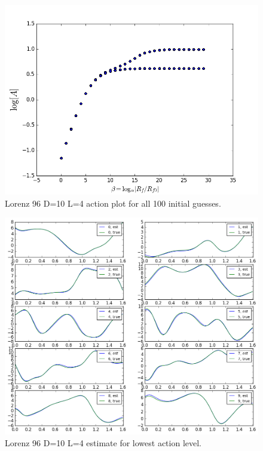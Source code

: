 \documentclass[11pt]{article}
\begin{document}
{\begin{figure}[h]
\centering
\includegraphics[width=1.0\textwidth]{figure/Lorenz96_single/action.png}
\caption{Lorenz 96 D=10 L=4 action plot for all 100 initial guesses.}
\label{fig:lorenz96}
\end{figure}

\begin{figure}[h]
\centering
\includegraphics[width=1.0\textwidth]{figure/Lorenz96_single/estimation.png}
\caption{Lorenz 96 D=10 L=4 estimate for lowest action level.}
\end{figure}


}
\end{document}
